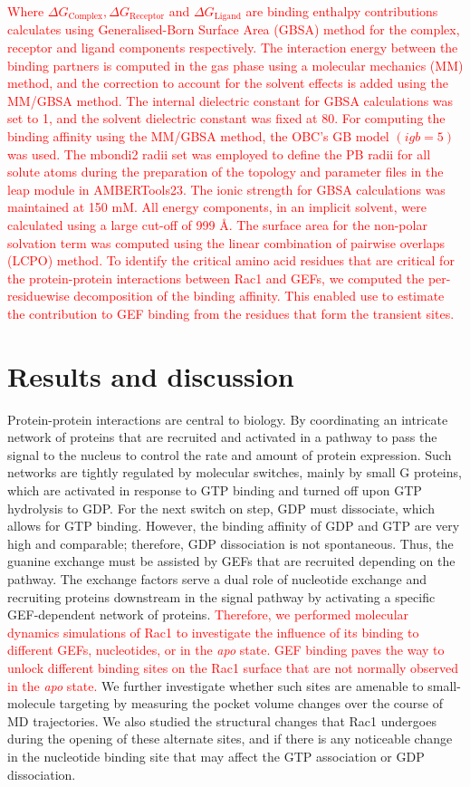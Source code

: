 \documentclass[12pt,a4paper]{achemso}
\begin{document}
\textcolor{red}{Where  ${\Delta}G_{\text{Complex}}, {\Delta}G_{\text{Receptor}}$ and $ {\Delta}G_{\text{Ligand}}$ are binding enthalpy contributions calculates using Generalised-Born Surface Area (GBSA) method for the complex, receptor and ligand components respectively. The interaction energy between the binding partners is computed in the gas phase using a molecular mechanics (MM) method, and the correction to account for the solvent effects is added using the MM/GBSA method. The internal dielectric constant for GBSA calculations was set to 1, and the solvent dielectric constant was fixed at 80. For computing the binding affinity using the MM/GBSA method, the OBC’s GB model\cite{igb5} $ (igb = 5) $ was used. The mbondi2 radii set was employed to define the PB radii for all solute atoms during the preparation of the topology and parameter files in the leap module in AMBERTools23. The ionic strength for GBSA calculations was maintained at 150 mM. All energy components, in an implicit solvent, were calculated using a large cut-off of 999 \r{A}. The surface area for the non-polar solvation term was computed using the linear combination of pairwise overlaps (LCPO) method\cite{lcpo}. To identify the critical amino acid residues that are critical for the protein-protein interactions between Rac1 and GEFs, we computed the per-residuewise decomposition of the binding affinity. This enabled use to estimate the contribution to GEF binding from the residues that form the transient sites.}

\section{Results and discussion}
Protein-protein interactions are central to biology. By coordinating an intricate network of proteins that are recruited and activated in a pathway to pass the signal to the nucleus to control the rate and amount of protein expression. Such networks are tightly regulated by molecular switches, mainly by small G proteins, which are activated in response to GTP binding and turned off upon GTP hydrolysis to GDP. For the next switch on step, GDP must dissociate, which allows for GTP binding. However, the binding affinity of GDP and GTP are very high and comparable; therefore, GDP dissociation is not spontaneous. Thus, the guanine exchange must be assisted by GEFs that are recruited depending on the pathway. The exchange factors serve a dual role of nucleotide exchange and recruiting proteins downstream in the signal pathway by activating a specific GEF-dependent network of proteins. \textcolor{red}{Therefore, we performed molecular dynamics simulations of Rac1 to investigate the influence of its binding to different GEFs, nucleotides, or in the \textit{apo} state. GEF binding paves the way to unlock different binding sites on the Rac1 surface that are not normally observed in the \textit{apo} state.} We further investigate whether such sites are amenable to small-molecule targeting by measuring the pocket volume changes over the course of MD trajectories. We also studied the structural changes that Rac1 undergoes during the opening of these alternate sites, and if there is any noticeable change in the nucleotide binding site that may affect the GTP association or GDP dissociation. 
\end{document}
